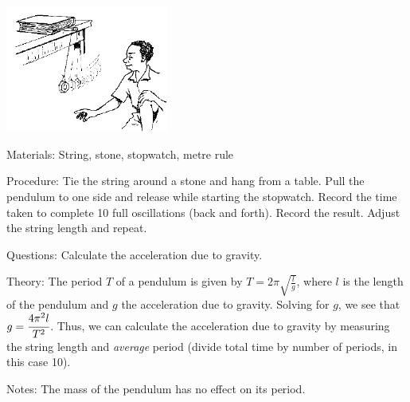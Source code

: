 \begin{multicols}{2}
\begin{center}
\includegraphics[width=0.4\textwidth]{./img/source/pendulum-gravity.png}
\end{center}

\begin{description*}
\item[Materials:]{String, stone, stopwatch, metre rule}
\item[Procedure:]{Tie the string around a stone and hang from a table. Pull the pendulum to one side and release while starting the stopwatch. Record the time taken to complete 10 full oscillations (back and forth). Record the result. Adjust the string length and repeat.}
\item[Questions:]{Calculate the acceleration due to gravity.}
\item[Theory:]{The period $T$ of a pendulum is given by $T = 2\pi\sqrt{\frac{l}{g}}$, where $l$ is the length of the pendulum and $g$ the acceleration due to gravity. Solving for $g$, we see that $g = \cfrac{4\pi^2l}{T^2}$. Thus, we can calculate the acceleration due to gravity by measuring the string length and \emph{average} period (divide total time by number of periods, in this case 10).}
\item[Notes:]{The mass of the pendulum has no effect on its period.}
\end{description*}






\end{multicols}

\pagebreak